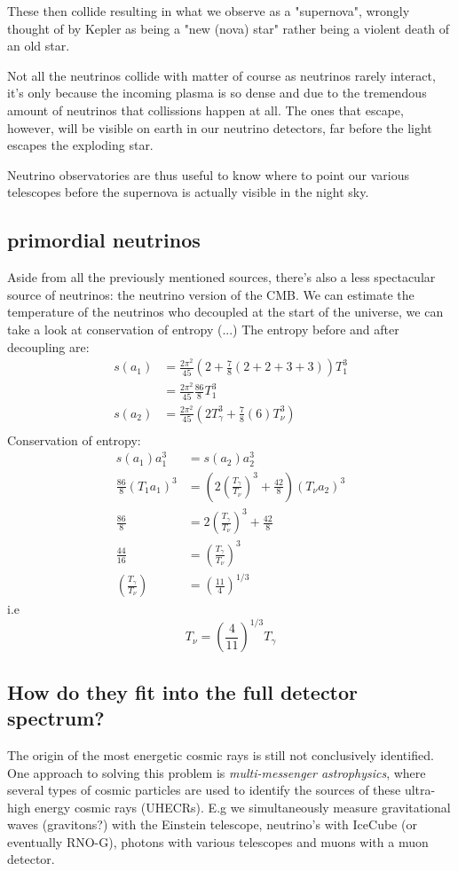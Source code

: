 \documentclass[11pt,a4paper,faculty=we,language=en,doctype=report]{cls/ugent-doc}
\begin{document}
These then collide resulting in what we observe as a "supernova", wrongly
thought of by Kepler as being a "new (nova) star" rather being a violent death
of an old star.

Not all the neutrinos collide with matter of course as neutrinos rarely
interact, it's only because the incoming plasma is so dense and due to the
tremendous amount of neutrinos that collissions happen at all. The ones that
escape, however, will be visible on earth in our neutrino detectors, far before
the light escapes the exploding star.

Neutrino observatories are thus useful to know where to point our various
telescopes before the supernova is actually visible in the night sky.
\subsection{primordial neutrinos}
Aside from all the previously mentioned sources, there's also a less spectacular source of 
neutrinos: the neutrino version of the CMB.
We can estimate the temperature of the neutrinos who decoupled at the start of the universe, 
we can take a look at conservation of entropy \cite{Dodelson}
(...)
The entropy before and after decoupling are:
\begin{align}
	s(a_1) &= \frac{2\pi^2}{45}(2 + \frac{7}{8}(2+2+3+3))T_1^3\\
	&= \frac{2\pi^2}{45}\frac{86}{8}T_1^3\\
	s(a_2) &= \frac{2\pi^2}{45}(2T_\gamma^3 + \frac{7}{8}(6)T_\nu^3)\\
\end{align}
Conservation of entropy:
\begin{align}
	s(a_1)a_1^3 &= s(a_2)a_2^3\\
	\frac{86}{8}(T_1 a_1)^3 &= \left(2\left(\frac{T_\gamma}{T_\nu}\right)^3 + \frac{42}{8}\right)(T_\nu a_2)^3\\
	\frac{86}{8} &= 2\left(\frac{T_\gamma}{T_\nu}\right)^3 + \frac{42}{8}\\
	\frac{44}{16} &= \left(\frac{T_\gamma}{T_\nu}\right)^3\\
	\left(\frac{T_\gamma}{T_\nu}\right) &= \left(\frac{11}{4}\right)^{1/3}
\end{align}
i.e
\begin{equation}
	T_\nu = \left(\frac{4}{11}\right)^{1/3}T_\gamma
\end{equation}
\subsection{How do they fit into the full detector spectrum?}
The origin of the most energetic cosmic rays is still not conclusively
identified. One approach to solving this problem is \textit{multi-messenger
astrophysics}, where several types of cosmic particles are used to identify the
sources of these ultra-high energy cosmic rays (UHECRs). E.g we simultaneously
measure gravitational waves (gravitons?) with the Einstein telescope,
neutrino's with IceCube (or eventually RNO-G), photons with various telescopes
and muons with a muon detector.
\newpage
\end{document}
